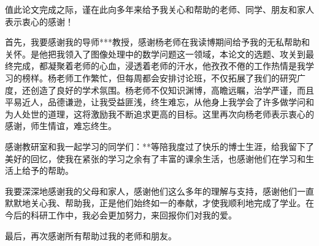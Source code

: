 \begin{thanks}

值此论文完成之际，谨在此向多年来给予我关心和帮助的老师、同学、朋友和家人表示衷心的感谢！

首先，我要感谢我的导师***教授，感谢杨老师在我读博期间给予我的无私帮助和关怀。是他把我领入了图像处理中的数学问题这一领域，本论文的选题、攻关到最终完成，都凝聚着老师的心血，浸透着老师的汗水，他孜孜不倦的工作热情是我学习的榜样。杨老师工作繁忙，但每周都会安排讨论班，不仅拓展了我们的研究广度，还创造了良好的学术氛围。杨老师不仅知识渊博，高瞻远瞩，治学严谨，而且平易近人，品德谦逊，让我受益匪浅，终生难忘，从他身上我学会了许多做学问和为人处世的道理，这将激励我不断追求更高的目标。这里再次向杨老师表示衷心的感谢，师生情谊，难忘终生。

感谢教研室和我一起学习的同学们：**等陪我度过了快乐的博士生涯，给我留下了美好的回忆，使我在紧张的学习之余有了丰富的课余生活，也感谢他们在学习和生活上给予的帮助。

我要深深地感谢我的父母和家人，感谢他们这么多年的理解与支持，感谢他们一直默默地关心我、帮助我，正是他们始终如一的奉献，才使我顺利地完成了学业。在今后的科研工作中，我必会更加努力，来回报你们对我的爱。

最后，再次感谢所有帮助过我的老师和朋友。

\end{thanks}